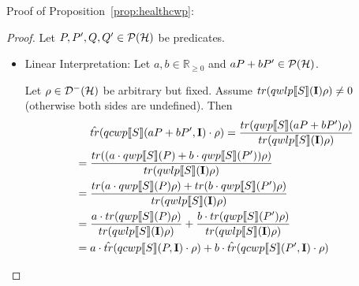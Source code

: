\documentclass[a4paper,UKenglish,cleveref, autoref, thm-restate]{lipics-v2021}
\begin{document}
Proof of Proposition~\ref{prop:healthcwp}:
\begin{proof}
    Let $P,P',Q,Q' \in \mathcal{P}(\mathcal{H})$ be predicates.
    \begin{itemize}
        \item Linear Interpretation:
        Let $a,b \in \mathbb{R}_{\geq 0}$ and $aP+bP' \in \mathcal{P}(\mathcal{H})$.

         Let $\rho \in \mathcal{D}^- (\mathcal{H})$ be arbitrary but fixed. Assume $tr(qwlp\llbracket S \rrbracket (\textbf{I})\rho) \neq 0$ (otherwise both sides are undefined). Then
        \begin{align*}
            &\phantom{=.}\hat{tr}(qcwp\llbracket S \rrbracket (aP+bP',\textbf{I}) \cdot\rho) = \frac{tr(qwp\llbracket S \rrbracket (aP+bP') \rho)}{tr(qwlp\llbracket S \rrbracket (\textbf{I})\rho)} \\
            &= \frac{tr((a \cdot qwp\llbracket S \rrbracket (P) + b\cdot qwp\llbracket S \rrbracket (P')) \rho)}{tr(qwlp\llbracket S \rrbracket (\textbf{I})\rho)} \\
            &= \frac{tr(a \cdot qwp\llbracket S \rrbracket (P) \rho) + tr(b\cdot qwp\llbracket S \rrbracket (P') \rho)}{tr(qwlp\llbracket S \rrbracket (\textbf{I})\rho)} \\
            &=\frac{a \cdot tr( qwp\llbracket S \rrbracket (P) \rho)}{tr(qwlp\llbracket S \rrbracket (\textbf{I})\rho)} + \frac{ b\cdot tr(qwp\llbracket S \rrbracket (P') \rho)}{tr(qwlp\llbracket S \rrbracket (\textbf{I})\rho)} \\
            &= a \cdot \hat{tr}(qcwp\llbracket S \rrbracket (P,\textbf{I})\cdot \rho) + b\cdot\hat{tr}(qcwp\llbracket S \rrbracket (P',\textbf{I})\cdot \rho)
        \end{align*}


\end{itemize}
\end{proof}
\end{document}
